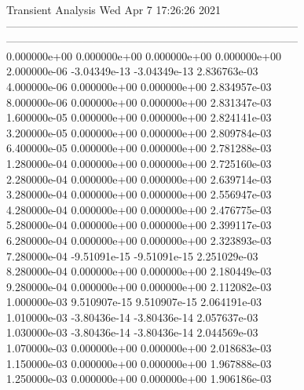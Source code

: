                                    Transient Analysis  Wed Apr  7 17:26:26  2021\\ \hline
--------------------------------------------------------------------------------\\ \hline
--------------------------------------------------------------------------------\\ 	0.000000e+00	0.000000e+00	0.000000e+00	0.000000e+00	\\ 	2.000000e-06	-3.04349e-13	-3.04349e-13	2.836763e-03	\\ 	4.000000e-06	0.000000e+00	0.000000e+00	2.834957e-03	\\ 	8.000000e-06	0.000000e+00	0.000000e+00	2.831347e-03	\\ 	1.600000e-05	0.000000e+00	0.000000e+00	2.824141e-03	\\ 	3.200000e-05	0.000000e+00	0.000000e+00	2.809784e-03	\\ 	6.400000e-05	0.000000e+00	0.000000e+00	2.781288e-03	\\ 	1.280000e-04	0.000000e+00	0.000000e+00	2.725160e-03	\\ 	2.280000e-04	0.000000e+00	0.000000e+00	2.639714e-03	\\ 	3.280000e-04	0.000000e+00	0.000000e+00	2.556947e-03	\\ 	4.280000e-04	0.000000e+00	0.000000e+00	2.476775e-03	\\ 	5.280000e-04	0.000000e+00	0.000000e+00	2.399117e-03	\\ 	6.280000e-04	0.000000e+00	0.000000e+00	2.323893e-03	\\ 	7.280000e-04	-9.51091e-15	-9.51091e-15	2.251029e-03	\\ 	8.280000e-04	0.000000e+00	0.000000e+00	2.180449e-03	\\ 	9.280000e-04	0.000000e+00	0.000000e+00	2.112082e-03	\\ 	1.000000e-03	9.510907e-15	9.510907e-15	2.064191e-03	\\ 	1.010000e-03	-3.80436e-14	-3.80436e-14	2.057637e-03	\\ 	1.030000e-03	-3.80436e-14	-3.80436e-14	2.044569e-03	\\ 	1.070000e-03	0.000000e+00	0.000000e+00	2.018683e-03	\\ 	1.150000e-03	0.000000e+00	0.000000e+00	1.967888e-03	\\ 	1.250000e-03	0.000000e+00	0.000000e+00	1.906186e-03	\\ \hline
